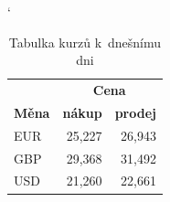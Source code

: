 \documentclass[a4paper, 11pt]{article}
\begin{document}
\bigskip

\begin{table}[h]
\catcode`
\centering
\begin{tabular}{|l|r|r|}
    \hline
    & \multicolumn{2}{|c|}{\textbf{Cena}} \\
    \cline{2-3}
    \textbf{Měna} & \textbf{nákup} & \textbf{prodej} \\
    \hline
    EUR & 25,227 & 26,943 \\
    GBP & 29,368 & 31,492 \\
    USD & 21,260 & 22,661 \\
    \hline
\end{tabular}
\caption{Tabulka kurzů k~dnešnímu dni}
\label{tabulka_1}
\end{table}

\bigskip
\end{document}
